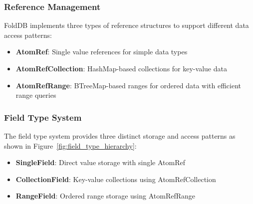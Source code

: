 \documentclass[11pt,a4paper]{article}
\begin{document}
\subsubsection{Reference Management}
FoldDB implements three types of reference structures to support different data access patterns:

\begin{itemize}
\item \textbf{AtomRef}: Single value references for simple data types
\item \textbf{AtomRefCollection}: HashMap-based collections for key-value data
\item \textbf{AtomRefRange}: BTreeMap-based ranges for ordered data with efficient range queries
\end{itemize}

\subsubsection{Field Type System}
The field type system provides three distinct storage and access patterns as shown in Figure~\ref{fig:field_type_hierarchy}:

\begin{itemize}
\item \textbf{SingleField}: Direct value storage with single AtomRef
\item \textbf{CollectionField}: Key-value collections using AtomRefCollection
\item \textbf{RangeField}: Ordered range storage using AtomRefRange
\end{itemize}
\end{document}
